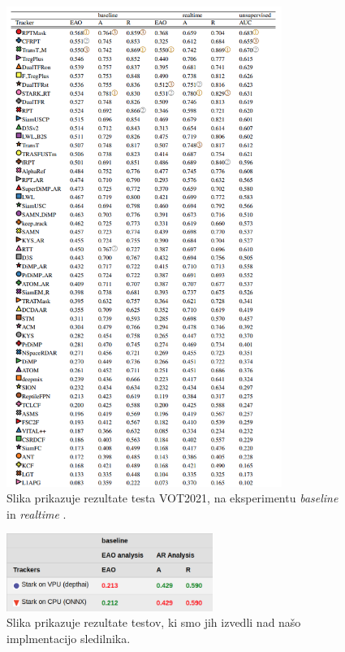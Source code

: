 \documentclass[a4paper,12pt,openright]{book}
\begin{document}
\begin{figure}[htb]
    \begin{center}
        \includegraphics[width=0.8\textwidth]{img/vot2021_res.png}
    \end{center}
    \caption{Slika prikazuje rezultate testa VOT2021, na eksperimentu \emph{baseline} in \emph{realtime} \cite{vot2021}.}
    \label{img:vot2021_res}
\end{figure}

\begin{figure}[htb]
    \begin{center}
        \includegraphics[width=0.6\textwidth]{img/vot.png}
    \end{center}
    \caption{Slika prikazuje rezultate testov, ki smo jih izvedli nad našo implmentacijo sledilnika.}
    \label{img:vot_res}
\end{figure}
\end{document}
